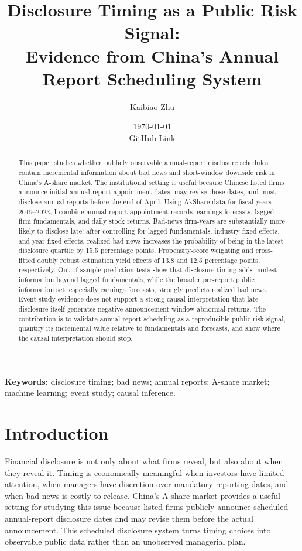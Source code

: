 \documentclass[10pt]{article}
\title{\vspace{-1.5em}\textbf{Disclosure Timing as a Public Risk Signal:\\Evidence from China's Annual Report Scheduling System}}
\author{Kaibiao Zhu}
\date{\today \\[0.3em] \underline{\href{https://github.com/George-hardworking/data-science-in-empirical-economics}{GitHub Link}}}
\begin{document}
\maketitle

\begin{abstract}
\noindent
This paper studies whether publicly observable annual-report disclosure schedules contain incremental information about bad news and short-window downside risk in China's A-share market. The institutional setting is useful because Chinese listed firms announce initial annual-report appointment dates, may revise those dates, and must disclose annual reports before the end of April. Using AkShare data for fiscal years 2019--2023, I combine annual-report appointment records, earnings forecasts, lagged firm fundamentals, and daily stock returns. Bad-news firm-years are substantially more likely to disclose late: after controlling for lagged fundamentals, industry fixed effects, and year fixed effects, realized bad news increases the probability of being in the latest disclosure quartile by 15.5 percentage points. Propensity-score weighting and cross-fitted doubly robust estimation yield effects of 13.8 and 12.5 percentage points, respectively. Out-of-sample prediction tests show that disclosure timing adds modest information beyond lagged fundamentals, while the broader pre-report public information set, especially earnings forecasts, strongly predicts realized bad news. Event-study evidence does not support a strong causal interpretation that late disclosure itself generates negative announcement-window abnormal returns. The contribution is to validate annual-report scheduling as a reproducible public risk signal, quantify its incremental value relative to fundamentals and forecasts, and show where the causal interpretation should stop.
\end{abstract}

\noindent \textbf{Keywords:} disclosure timing; bad news; annual reports; A-share market; machine learning; event study; causal inference.

\section{Introduction}

Financial disclosure is not only about what firms reveal, but also about when they reveal it. Timing is economically meaningful when investors have limited attention, when managers have discretion over mandatory reporting dates, and when bad news is costly to release. China's A-share market provides a useful setting for studying this issue because listed firms publicly announce scheduled annual-report disclosure dates and may revise them before the actual announcement. This scheduled disclosure system turns timing choices into observable public data rather than an unobserved managerial plan.
\end{document}
